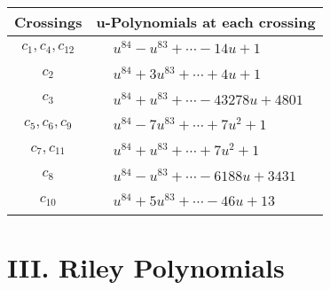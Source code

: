 \documentclass[1p]{elsarticle_modified}
\theoremstyle{definition}
\begin{document}
\begin{tabular}{m{50pt}|m{274pt}}
Crossings & \hspace{64pt}u-Polynomials at each crossing \\
\hline $$\begin{aligned}c_{1},c_{4},c_{12}\end{aligned}$$&$\begin{aligned}
&u^{84}- u^{83}+\cdots-14 u+1
\end{aligned}$\\
\hline $$\begin{aligned}c_{2}\end{aligned}$$&$\begin{aligned}
&u^{84}+3 u^{83}+\cdots+4 u+1
\end{aligned}$\\
\hline $$\begin{aligned}c_{3}\end{aligned}$$&$\begin{aligned}
&u^{84}+u^{83}+\cdots-43278 u+4801
\end{aligned}$\\
\hline $$\begin{aligned}c_{5},c_{6},c_{9}\end{aligned}$$&$\begin{aligned}
&u^{84}-7 u^{83}+\cdots+7 u^2+1
\end{aligned}$\\
\hline $$\begin{aligned}c_{7},c_{11}\end{aligned}$$&$\begin{aligned}
&u^{84}+u^{83}+\cdots+7 u^2+1
\end{aligned}$\\
\hline $$\begin{aligned}c_{8}\end{aligned}$$&$\begin{aligned}
&u^{84}- u^{83}+\cdots-6188 u+3431
\end{aligned}$\\
\hline $$\begin{aligned}c_{10}\end{aligned}$$&$\begin{aligned}
&u^{84}+5 u^{83}+\cdots-46 u+13
\end{aligned}$\\
\hline
\end{tabular}\newpage\renewcommand{\arraystretch}{1}
\centering \section*{ III. Riley Polynomials}
\end{document}
